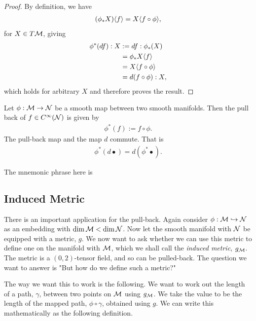 \documentclass[12pt]{article} %
\begin{document}
\begin{proof}
    By definition, we have
\begin{align*}
    (\phi_*X)\langle f \rangle = X \langle f\circ \phi \rangle,
\end{align*}
for $X\in T\mathcal{M}$, giving
\begin{align*}
    \begin{split}
        \phi^*(df) : X & := df : \phi_*(X) \\
        & = \phi_* X \langle f \rangle \\
        & = X \langle f\circ \phi \rangle \\
        & = d(f\circ \phi) : X ,
    \end{split}
\end{align*}
which holds for arbitrary $X$ and therefore proves the result. 
\end{proof}

\bd 
    Let $\phi:\mathcal{M}\to\mathcal{N}$ be a smooth map between two smooth manifolds. Then the pull back of $f\in C^{\infty}(\mathcal{N})$ is given by 
    \begin{align*} 
        \phi^*(f) := f\circ \phi.
    \end{align*} 
\ed 
\bp 
    The pull-back map and the map $d$ commute. That is 
    \begin{align*} 
        \phi^*(d \bullet) = d(\phi^*\bullet).
    \end{align*} 
\ep 
\begin{rema}
 The mnemonic phrase here is 
\end{rema}


\subsection{Induced Metric}

There is an important application for the pull-back. Again consider $\phi:\mathcal{M}\hookrightarrow\mathcal{N}$ as an embedding with $\dim\mathcal{M} <\dim\mathcal{N}$. Now let the smooth manifold with $\mathcal{N}$ be equipped with a metric, $g$. We now want to ask whether we can use this metric to define one on the manifold with $\mathcal{M}$, which we shall call the \textit{induced metric}, $g_{\mathcal{M}}$. The metric is a $(0,2)$-tensor field, and so can be pulled-back. The question we want to answer is "But how do we define such a metric?"

The way we want this to work is the following. We want to work out the length of a path, $\gamma$, between two points on $\mathcal{M}$ using $g_{\mathcal{M}}$. We take the value to be the length of the mapped path, $\phi\circ\gamma$, obtained using $g$. We can write this mathematically as the following definition. 
\end{document}
